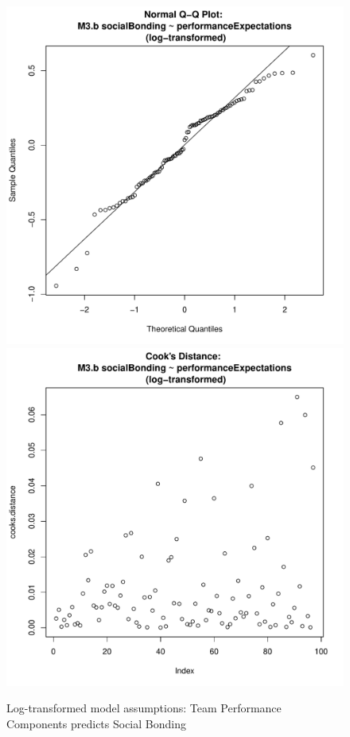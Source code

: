 \begin{figure}[htbp]
        \includegraphics[scale =.4]{images/MLM3bLogQQNorm.pdf}
        \includegraphics[scale =.4]{images/MLM3bLogCooksD.pdf}
        \caption{Log-transformed model assumptions: Team Performance Components predicts Social Bonding}
        \label{fig:MLM3bLogAssumptions}
      \end{figure}




